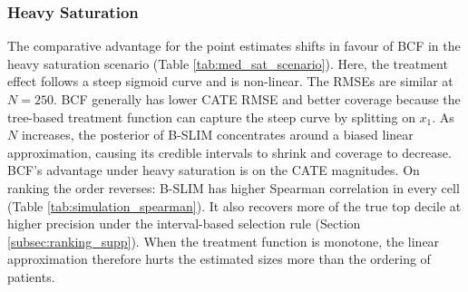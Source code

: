 \documentclass[12pt]{article}
\begin{document}
\subsubsection{Heavy Saturation}
The comparative advantage for the point estimates shifts in favour of BCF in the heavy saturation scenario (Table \ref{tab:med_sat_scenario}). Here, the treatment effect follows a steep sigmoid curve and is non-linear. The RMSEs are similar at $N=250$. BCF generally has lower CATE RMSE and better coverage because the tree-based treatment function can capture the steep curve by splitting on $x_1$. As $N$ increases, the posterior of B-SLIM concentrates around a biased linear approximation, causing its credible intervals to shrink and coverage to decrease. BCF's advantage under heavy saturation is on the CATE magnitudes. On ranking the order reverses: B-SLIM has higher Spearman correlation in every cell (Table \ref{tab:simulation_spearman}). It also recovers more of the true top decile at higher precision under the interval-based selection rule (Section \ref{subsec:ranking_supp}). When the treatment function is monotone, the linear approximation therefore hurts the estimated sizes more than the ordering of patients.
\end{document}
